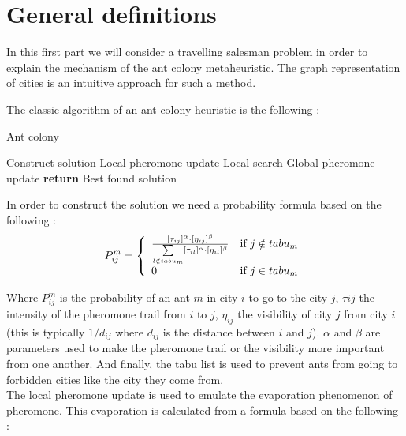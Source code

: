 \documentclass[UTF8, twoside]{EPURapport}
\begin{document}
\section{General definitions}

 	\hspace{4ex}In this first part we will consider a travelling salesman problem in order to explain the mechanism of the ant colony metaheuristic. The graph representation of cities is an intuitive approach for such a method.
	
	
	The classic algorithm of an ant colony heuristic is the following :

\begin{algorithm}
  \caption{Ant colony}
  \begin{algorithmic}[1]
        	\State Construct solution
			\State Local pheromone update
        \EndFor
        \State Local search
        \State Global pheromone update
      \EndFor
      \State \textbf{return} Best found solution
  \end{algorithmic}
\end{algorithm}

	In order to construct the solution we need a probability formula based on the following :
	\\

\[
P^m_{ij}= \left\{ 
\begin{array}{l r}
\frac{[\tau_{ij}]^\alpha \cdot [\eta_{ij}]^\beta}{\underset{l\notin tabu_m}{\sum}[\tau_{il}]^\alpha \cdot [\eta_{il}]^\beta} & \text{if } j\notin tabu_m\\
0 & \text{if } j\in tabu_m
\end{array}
\right.
\]

	Where $P^m_{ij}$ is the probability of an ant $m$ in city $i$ to go to the city $j$, $\tau{ij}$ the intensity of the pheromone trail from $i$ to $j$, $\eta_{ij}$  the visibility of city $j$ from city $i$ (this is typically $1/d_{ij}$ where $d_{ij}$ is the distance between $i$ and $j$). $\alpha$ and $\beta$ are parameters used to make the pheromone trail or the visibility more important from one another. And finally, the tabu list is used to prevent ants from going to forbidden cities like the city they come from.
\\

	The local pheromone update is used to emulate the evaporation phenomenon of pheromone. This evaporation is calculated from a formula based on the following :
	\\
	
\end{document}
